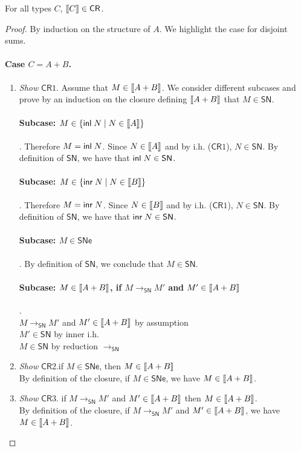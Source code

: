 \documentclass{article}
\newcommand{\SN}{\mathsf{SN}}
\newcommand{\SNe}{\mathsf{SNe}}
\newcommand{\CR}{\mathsf{CR}}
\newcommand{\redSN}{\longrightarrow_\SN}
\def\lv{\mathopen{{[\kern-0.14em[}}}    %
\def\rv{\mathclose{{]\kern-0.14em]}}}   %
\newcommand{\den}[1]{\lv #1 \rv}
\begin{document}
\begin{theorem}
For all types $C$, $\den{C}  \in \CR$.
\end{theorem}
\begin{proof}
By induction on the structure of $A$. We highlight the case for disjoint sums.

\paragraph{Case $C = A + B$.} 

  \begin{enumerate}
  \item \textit{Show} $\CR1$. Assume that $M \in \den{A + B}$. We consider different subcases and prove by an induction on the closure defining $\den{A + B}$ that $M \in \SN$.

\paragraph{Subcase: $M \in \{\inl N \mid N \in \den{A}\}$}. Therefore $M = \textsf{inl}\; N$. Since $N \in \den{A}$ and by i.h. ($\CR1$), $N \in \SN$. By definition of $\SN$, we have that $\inl N \in \SN$. 
  
\paragraph{Subcase: $M \in \{\inr N \mid N \in \den{B}\}$}. Therefore $M = \textsf{inr}\; N$. Since $N \in \den{B}$ and by i.h. ($\CR1$), $N \in \SN$. By definition of $\SN$, we have that $\inr N \in \SN$. 

\paragraph{Subcase: $M \in \SNe$}. By definition of $\SN$, we conclude that $M \in \SN$.

\paragraph{Subcase: $M \in \den{A+B}$, if $M \redSN M'$ and $M' \in \den{A+B}$}.
\\[0.5em]
$M \redSN M'$ and $M' \in \den{A + B}$ \hfill by assumption\\
$M' \in \SN$ \hfill by inner i.h. \\ 
$M \in \SN$ \hfill by reduction $\redSN$

 \item \textit{Show} $\CR2$.if $M \in \SNe$, then $M \in \den{A + B}$\\
By definition of the closure, if $M \in \SNe$, we have $M \in \den{A + B}$.


  \item \textit{Show} $\CR3$. if $M \redSN M'$ and $M' \in \den{A+B}$ 
    then $M \in \den{A+B}$.\\
By definition of the closure, if $M \redSN M'$ and $M' \in \den{A+B}$, we have
$M \in \den{A+B}$.
\end{enumerate}

\end{proof}
\end{document}
